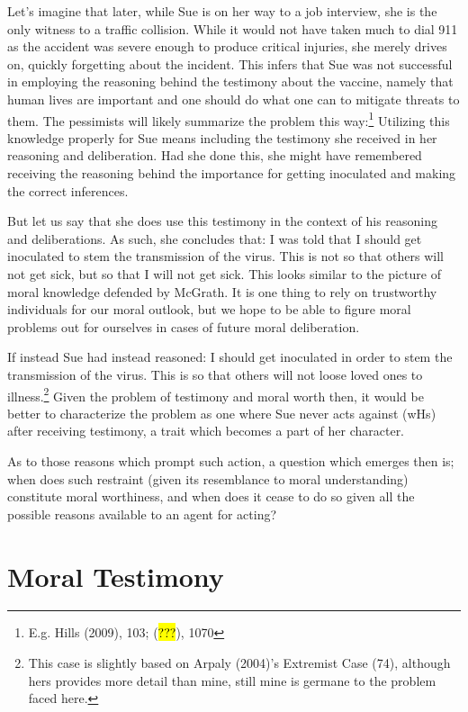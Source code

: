 \documentclass[
  letterpaper,
  DIV=11,
  numbers=noendperiod]{scrartcl}
\theoremstyle{remark}
\begin{document}
Let's imagine that later, while Sue is on her way to a job interview,
she is the only witness to a traffic collision. While it would not have
taken much to dial 911 as the accident was severe enough to produce
critical injuries, she merely drives on, quickly forgetting about the
incident. This infers that Sue was not successful in employing the
reasoning behind the testimony about the vaccine, namely that human
lives are important and one should do what one can to mitigate threats
to them. The pessimists will likely summarize the problem this
way:\footnote{E.g. Hills (2009), 103; (\hl{???}), 1070} Utilizing this
knowledge properly for Sue means including the testimony she received in
her reasoning and deliberation. Had she done this, she might have
remembered receiving the reasoning behind the importance for getting
inoculated and making the correct inferences.

But let us say that she does use this testimony in the context of his
reasoning and deliberations. As such, she concludes that: I was told
that I should get inoculated to stem the transmission of the virus. This
is not so that others will not get sick, but so that I will not get
sick. This looks similar to the picture of moral knowledge defended by
McGrath. It is one thing to rely on trustworthy individuals for our
moral outlook, but we hope to be able to figure moral problems out for
ourselves in cases of future moral deliberation.

If instead Sue had instead reasoned: I should get inoculated in order to
stem the transmission of the virus. This is so that others will not
loose loved ones to illness.\footnote{This case is slightly based on
  Arpaly (2004)'s Extremist Case (74), although hers provides more
  detail than mine, still mine is germane to the problem faced here.}
Given the problem of testimony and moral worth then, it would be better
to characterize the problem as one where Sue never acts against (wHs)
after receiving testimony, a trait which becomes a part of her
character.

As to those reasons which prompt such action, a question which emerges
then is; when does such restraint (given its resemblance to moral
understanding) constitute moral worthiness, and when does it cease to do
so given all the possible reasons available to an agent for acting?

\section{Moral Testimony}\label{moral-testimony-1}
\end{document}
